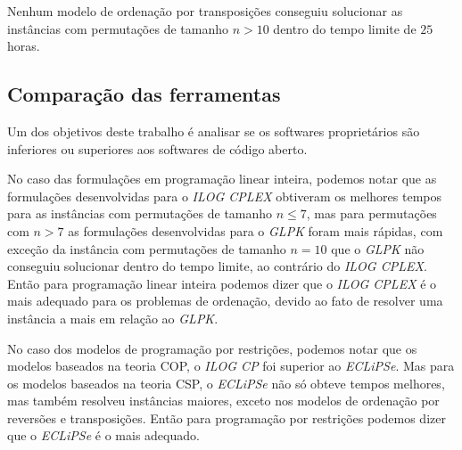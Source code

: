 Nenhum modelo de ordenação por transposições conseguiu solucionar as
instâncias com permutações de tamanho $n > 10$ dentro do tempo limite
de $25$ horas.



\subsection{Comparação das ferramentas}
\label{subsec:analise_ferramentas}
Um dos objetivos deste trabalho é analisar se os softwares
proprietários são inferiores ou superiores aos softwares de código
aberto.

No caso das formulações em programação linear inteira, podemos notar
que as formulações desenvolvidas para o \textit{ILOG CPLEX} obtiveram
os melhores tempos para as instâncias com permutações de tamanho
$n \le 7$, mas para permutações com $n > 7$ as formulações
desenvolvidas para o \textit{GLPK} foram mais rápidas, com exceção da
instância com permutações de tamanho $n = 10$ que o \textit{GLPK} não
conseguiu solucionar dentro do tempo limite, ao contrário
do \textit{ILOG CPLEX}. Então para programação linear inteira podemos
dizer que o \textit{ILOG CPLEX} é o mais adequado para os problemas de
ordenação, devido ao fato de resolver uma instância a mais em relação
ao \textit{GLPK}.

No caso dos modelos de programação por restrições, podemos notar que
os modelos baseados na teoria COP, o \textit{ILOG CP} foi superior
ao \textit{ECLiPSe}. Mas para os modelos baseados na teoria CSP,
o \textit{ECLiPSe} não só obteve tempos melhores, mas também resolveu
instâncias maiores, exceto nos modelos de ordenação por reversões e
transposições. Então para programação por restrições podemos dizer que
o \textit{ECLiPSe} é o mais adequado.

